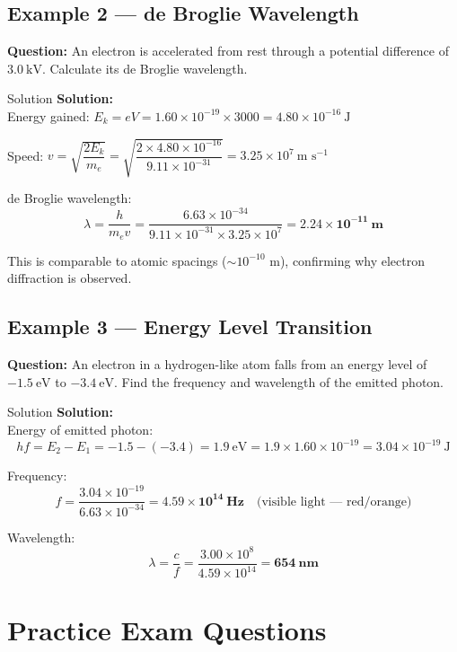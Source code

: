 \subsection*{Example 2 — de Broglie Wavelength}

\textbf{Question:} An electron is accelerated from rest through a potential difference of $3.0\ \text{kV}$. Calculate its de Broglie wavelength.

\begin{examplebox}{Solution}
\textbf{Solution:}\\
Energy gained: $E_k = eV = 1.60\times10^{-19} \times 3000 = 4.80\times10^{-16}\ \text{J}$

Speed: $v = \sqrt{\dfrac{2E_k}{m_e}} = \sqrt{\dfrac{2\times4.80\times10^{-16}}{9.11\times10^{-31}}} = 3.25\times10^7\ \text{m s}^{-1}$

de Broglie wavelength:
$$\lambda = \frac{h}{m_e v} = \frac{6.63\times10^{-34}}{9.11\times10^{-31}\times 3.25\times10^7} = \mathbf{2.24\times10^{-11}\ \text{m}}$$

This is comparable to atomic spacings ($\sim 10^{-10}$ m), confirming why electron diffraction is observed.
\end{examplebox}

\subsection*{Example 3 — Energy Level Transition}

\textbf{Question:} An electron in a hydrogen-like atom falls from an energy level of $-1.5\ \text{eV}$ to $-3.4\ \text{eV}$. Find the frequency and wavelength of the emitted photon.

\begin{examplebox}{Solution}
\textbf{Solution:}\\
Energy of emitted photon:
$$hf = E_2 - E_1 = -1.5 - (-3.4) = 1.9\ \text{eV} = 1.9\times1.60\times10^{-19} = 3.04\times10^{-19}\ \text{J}$$

Frequency:
$$f = \frac{3.04\times10^{-19}}{6.63\times10^{-34}} = \mathbf{4.59\times10^{14}\ \text{Hz}} \quad \text{(visible light — red/orange)}$$

Wavelength:
$$\lambda = \frac{c}{f} = \frac{3.00\times10^8}{4.59\times10^{14}} = \mathbf{654\ \text{nm}}$$
\end{examplebox}

\section{Practice Exam Questions}

